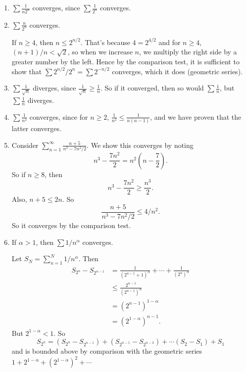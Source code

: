 \documentclass[a4paper]{article}
\begin{document}
\begin{eg}\leavevmode
  \begin{enumerate}
    \item $\sum \frac{1}{n2^n}$ converges, since $\sum \frac{1}{2^n}$ converges.
    \item $\sum \frac{n}{2^n}$ converges.

      If $n \geq 4$, then $n \leq 2^{n/2}$. That's because $4 = 2^{4/2}$ and for $n\geq 4$, $(n + 1)/n < \sqrt{2}$, so when we increase $n$, we multiply the right side by a greater number by the left. Hence by the comparison test, it is sufficient to show that $\sum 2^{n/2}/2^n = \sum 2^{-n/2}$ converges, which it does (geometric series).
    \item $\sum \frac{1}{\sqrt{n}}$ diverges, since $\frac{1}{\sqrt{n}} \geq \frac{1}{n}$. So if it converged, then so would $\sum \frac{1}{n}$, but $\sum \frac{1}{n}$ diverges.
    \item $\sum \frac{1}{n^2}$ converges, since for $n \geq 2$, $\frac{1}{n^2} \leq \frac{1}{n(n - 1)}$, and we have proven that the latter converges.
    \item Consider $\displaystyle \sum_{n = 1}^\infty \frac{n + 5}{n^3 - 7n^2/2}$. We show this converges by noting
      \[
        n^3 - \frac{7n^2}{2} = n^2\left(n - \frac{7}{2}\right).
      \]
      So if $n \geq 8$, then
      \[
        n^3 - \frac{7n^2}{2} \geq \frac{n^3}{2}.
      \]
      Also, $n + 5 \leq 2n$. So
      \[
        \frac{n + 5}{n^3 - 7n^2/2} \leq 4/n^2.
      \]
      So it converges by the comparison test.
    \item If $\alpha > 1$, then $\sum 1/n^\alpha$ converges.

      Let $S_N = \sum_{n = 1}^N 1/n^\alpha$. Then
      \begin{align*}
        S_{2^n} - S_{2^{n - 1}} &= \frac{1}{(2^{n - 1} + 1)^\alpha} + \cdots + \frac{1}{(2^{n})^\alpha}\\
        &\leq \frac{2^{n - 1}}{(2^{n - 1})^\alpha}\\
        &= (2^{n - 1})^{1 - \alpha}\\
        &= (2^{1 - \alpha})^{n - 1}.
      \end{align*}
      But $2^{1 - \alpha} < 1$. So
      \[
        S_{2^n} = (S_{2^n} - S_{2^{n - 1}}) + (S_{2^{n - 1}} - S_{2^{n -2 }}) + \cdots (S_2 - S_1) + S_1
      \]
      and is bounded above by comparison with the geometric series $1 + 2^{1 - \alpha} + (2^{1 - \alpha})^2 + \cdots$
  \end{enumerate}
\end{eg}
\end{document}
